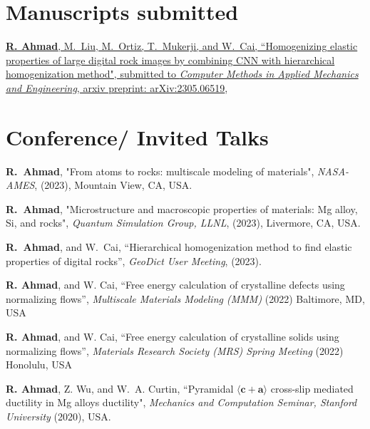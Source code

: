 \documentclass[margin,line]{resume}
\begin{document}
\begin{resume}
    \section{\mysidestyle Manuscripts submitted}

    \href{https://arxiv.org/pdf/2305.06519.pdf}{\textbf{R. Ahmad}, M.~Liu, M.~Ortiz, T.~Mukerji, and W.~Cai, ``Homogenizing elastic properties of large digital rock images by combining CNN with hierarchical homogenization method", submitted to \textit{Computer Methods in Applied Mechanics and Engineering}, arxiv preprint: arXiv:2305.06519},




    \section{\mysidestyle Conference/ Invited Talks}
    \textbf{R.~Ahmad}, "From atoms to rocks: multiscale modeling of materials", \textit{NASA-AMES}, (2023), Mountain View, CA, USA.

    \textbf{R.~Ahmad}, "Microstructure and macroscopic properties of materials: Mg alloy, Si, and rocks", \textit{Quantum Simulation Group, LLNL}, (2023), Livermore, CA, USA.

    \textbf{R.~Ahmad}, and W.~Cai, ``Hierarchical homogenization method to find elastic properties of digital rocks'',  \textit{GeoDict User Meeting}, (2023).

    \textbf{R. Ahmad}, and W. Cai, ``Free energy calculation of crystalline defects using normalizing flows'', \textit{Multiscale Materials Modeling (MMM)} (2022) Baltimore, MD, USA

    \textbf{R. Ahmad}, and W. Cai, ``Free energy calculation of crystalline solids using normalizing flows'', \textit{Materials Research Society (MRS) Spring Meeting} (2022) Honolulu, USA

    \textbf{R. Ahmad}, Z. Wu, and W.~A. Curtin, ``Pyramidal $\langle \boldsymbol{c} + \boldsymbol{a} \rangle$ cross-slip mediated ductility in Mg alloys ductility", \textit{Mechanics and Computation Seminar, Stanford University} (2020), USA.


\end{resume}
\end{document}
